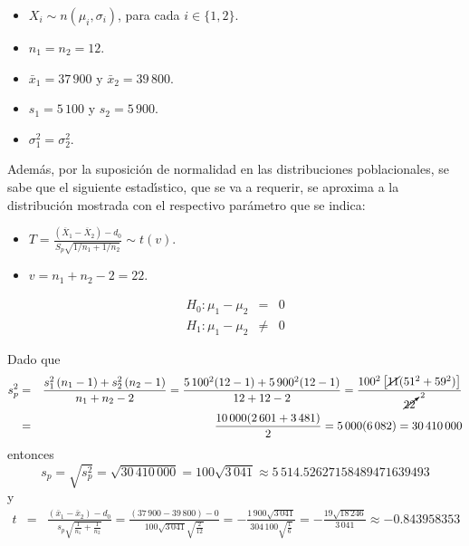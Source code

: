 \begin{solucion}
 \begin{datos}
  $\phantom{0}$
  \begin{itemize}
   \item $X_i \sim n\left( \mu_i, \sigma_i \right)$,
   para cada $i \in \{ 1, 2\}$.
   \item $n_1 = n_2 = 12$.
   \item $\bar{x}_1 = 37\,900$ y $\bar{x}_2 = 39\,800$.
   \item $s_1 = 5\,100$ y $s_2 = 5\,900$.
   \item $\sigma_1^2 = \sigma_2^2$.
  \end{itemize}
  Adem\'as, por la suposici\'on de normalidad en las distribuciones
  poblacionales, se sabe que el siguiente estad\'{\i}stico,
  que se va a requerir, se aproxima a la distribuci\'on mostrada
  con el respectivo par\'ametro que se indica:
  \begin{itemize}
   \item $T = \frac{
   \left( \overline{X}_1 - \overline{X}_2 \right) - d_0
   }{
   S_p\sqrt{1/n_1 + 1/n_2}
   } \sim t(v)$.
   \item $v = n_1 + n_2 - 2 = 22$.
  \end{itemize}
 \end{datos}

 \begin{hipotesis}
  \begin{eqnarray*}
   H_0: \mu_1 - \mu_2 &  =   & 0 \\
   H_1: \mu_1 - \mu_2 & \neq & 0
  \end{eqnarray*}
 \end{hipotesis}

 \begin{estadistico}
  Dado que
  \begin{eqnarray*}
   s_p^2 & = &
   \frac{
   s_1^2\left( n_1 - 1 \right) + s_2^2\left( n_2 - 1 \right)
   }{
   n_1 + n_2 - 2
   }
   = \frac{5\,100^2(12 - 1) + 5\,900^2(12 - 1)}{12+12-2} 
   = \frac{100^2\left[ \cancel{11}(51^2 + 59^2) \right]}{\cancelto{2}{22}}
   \\
   & = & \frac{10\,000(2\,601 + 3\,481)}{2} = 5\,000(6\,082)
   = 30\,410\,000
  \end{eqnarray*}
  entonces
  \begin{equation*}
   s_p = \sqrt{s_p^2} = \sqrt{30\,410\,000} = 100\sqrt{3\,041}
   \approx 5\,514.52627158489471639493
  \end{equation*}
  y
  \begin{eqnarray*}
   t & = &
   \frac{
   \left( \bar{x}_1 - \bar{x}_2 \right) - d_0
   }{
   s_p\sqrt{\frac{1}{n_1} + \frac{1}{n_2}}
   }
   = \frac{(37\,900 - 39\,800) - 0}{100\sqrt{3\,041}\sqrt{\frac{2}{12}}}
   = -\frac{1\,900\sqrt{3\,041}}{304\,100\sqrt{\frac{1}{6}}}
   = -\frac{19\sqrt{18\,246}}{3\,041}
   \approx -0.843958353
  \end{eqnarray*}
 \end{estadistico}


\end{solucion}
